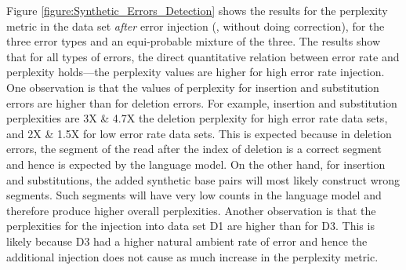 Figure \ref{figure:Synthetic_Errors_Detection} shows the results for the perplexity metric in the data set {\em after} error injection (\ie, without doing correction), for the three error types and an equi-probable mixture of the three. The results show that for all types of errors, the direct quantitative relation between error rate and perplexity holds---the perplexity values are higher for high error rate injection. One observation is that the values of perplexity for insertion and substitution errors are higher than for deletion errors. For example, insertion and substitution perplexities are 3X \& 4.7X the deletion perplexity for high error rate data sets, and 2X \& 1.5X for low error rate data sets. This is expected because in deletion errors, the segment of the read after the index of deletion is a correct segment and hence is expected by the language model. On the other hand, for insertion and substitutions, the added synthetic base pairs will most likely construct wrong segments. Such segments will have very low counts in the language model and therefore produce higher overall perplexities.
Another observation is that the perplexities for the injection into data set D1 are higher than for D3. This is likely because D3 had a higher natural ambient rate of error and hence the additional injection does not cause as much increase in the perplexity metric.

